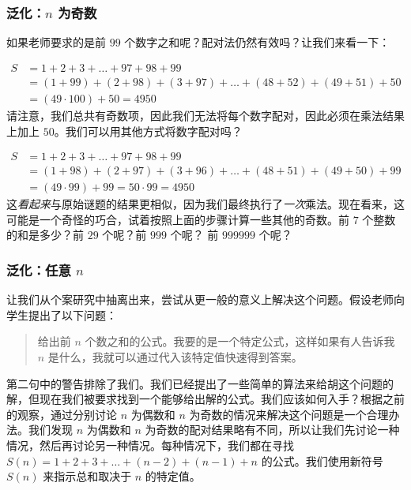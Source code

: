 \subsubsection*{泛化：$n$ 为奇数}

如果老师要求的是前 $99$ 个数字之和呢？配对法仍然有效吗？让我们来看一下：

\begin{align*}
    S &= 1 + 2 + 3 + \dots + 97 + 98 + 99 \\
    &= (1 + 99) + (2 + 98) + (3 + 97) + \dots + (48 + 52) + (49 + 51) + 50 \\
    &= (49 \cdot 100) + 50 = 4950
\end{align*}
请注意，我们总共有奇数项，因此我们无法将每个数字配对，因此必须在乘法结果上加上 $50$。我们可以用其他方式将数字配对吗？

\begin{align*}
    S &= 1 + 2 + 3 + \dots + 97 + 98 + 99 \\
    &= (1 + 98) + (2 + 97) + (3 + 96) + \dots + (48 + 51) + (49 + 50) + 99 \\
    &= (49 \cdot 99) + 99 = 50 \cdot 99 = 4950
\end{align*}
这\textit{看起来}与原始谜题的结果更相似，因为我们最终执行了\textit{一次}乘法。现在看来，这可能是一个奇怪的巧合，试着按照上面的步骤计算一些其他的奇数。前 $7$ 个整数的和是多少？前 $29$ 个呢？前 $999$ 个呢？ 前 $999999$ 个呢？

\subsubsection*{泛化：任意 $n$}

让我们从个案研究中抽离出来，尝试从更一般的意义上解决这个问题。假设老师向学生提出了以下问题：

\begin{quote}
    给出前 $n$ 个数之和的公式。我要的是一个特定公式，这样如果有人告诉我 $n$ 是什么，我就可以通过代入该特定值快速得到答案。
\end{quote}

第二句中的警告排除了我们。我们已经提出了一些简单的算法来给胡这个问题的解，但现在我们被要求找到一个能够给出解的公式。我们应该如何入手？根据之前的观察，通过分别讨论 $n$ 为偶数和 $n$ 为奇数的情况来解决这个问题是一个合理办法。我们发现 $n$ 为偶数和 $n$ 为奇数的配对结果略有不同，所以让我们先讨论一种情况，然后再讨论另一种情况。每种情况下，我们都在寻找 $S(n) = 1 + 2 + 3 + \dots + (n - 2) + (n - 1) + n$ 的公式。我们使用新符号 $S(n)$ 来指示总和取决于 $n$ 的特定值。

